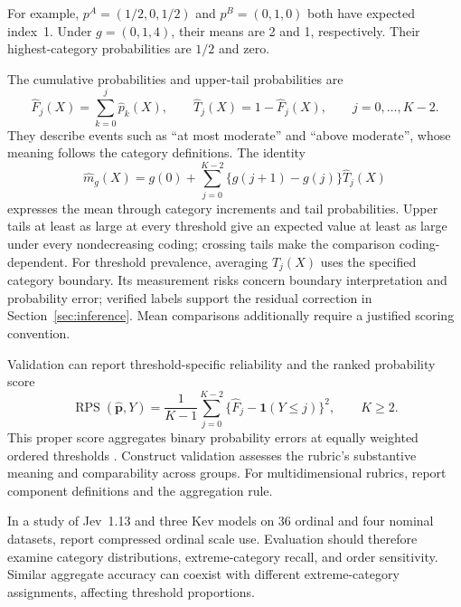 \documentclass[11pt,a4paper]{article}
\newcommand{\ind}{\mathbf{1}}
\begin{document}
For example, $p^{A}=(1/2,0,1/2)$ and $p^{B}=(0,1,0)$ both have expected index~1. Under $g=(0,1,4)$, their means are 2 and 1, respectively. Their highest-category probabilities are $1/2$ and zero.

The cumulative probabilities and upper-tail probabilities are
\begin{equation}
 \widehat F_j(X)=\sum_{k=0}^{j}\widehat p_k(X),\qquad
 \widehat T_j(X)=1-\widehat F_j(X),\qquad j=0,\ldots,K-2.
 \label{eq:ordinal-cumulative}
\end{equation}
They describe events such as ``at most moderate'' and ``above moderate'', whose meaning follows the category definitions. The identity
\begin{equation}
 \widehat m_g(X)=g(0)+\sum_{j=0}^{K-2}
       \{g(j+1)-g(j)\}\widehat T_j(X)
 \label{eq:ordinal-tail}
\end{equation}
expresses the mean through category increments and tail probabilities. Upper tails at least as large at every threshold give an expected value at least as large under every nondecreasing coding; crossing tails make the comparison coding-dependent. For threshold prevalence, averaging $\widehat T_j(X)$ uses the specified category boundary. Its measurement risks concern boundary interpretation and probability error; verified labels support the residual correction in Section~\ref{sec:inference}. Mean comparisons additionally require a justified scoring convention.

Validation can report threshold-specific reliability and the ranked probability score
\begin{equation}
 \operatorname{RPS}(\widehat{\boldsymbol p},Y)=
 \frac{1}{K-1}\sum_{j=0}^{K-2}
       \bigl\{\widehat F_j-\ind(Y\leq j)\bigr\}^{2},\qquad K\geq2.
 \label{eq:rps}
\end{equation}
This proper score aggregates binary probability errors at equally weighted ordered thresholds \citep{gneiting2007}. Construct validation assesses the rubric's substantive meaning and comparability across groups. For multidimensional rubrics, report component definitions and the aggregation rule.

In a study of Jev~1.13 and three Kev models on 36 ordinal and four nominal datasets, \citet{gao2026} report compressed ordinal scale use. Evaluation should therefore examine category distributions, extreme-category recall, and order sensitivity. Similar aggregate accuracy can coexist with different extreme-category assignments, affecting threshold proportions.
\end{document}
